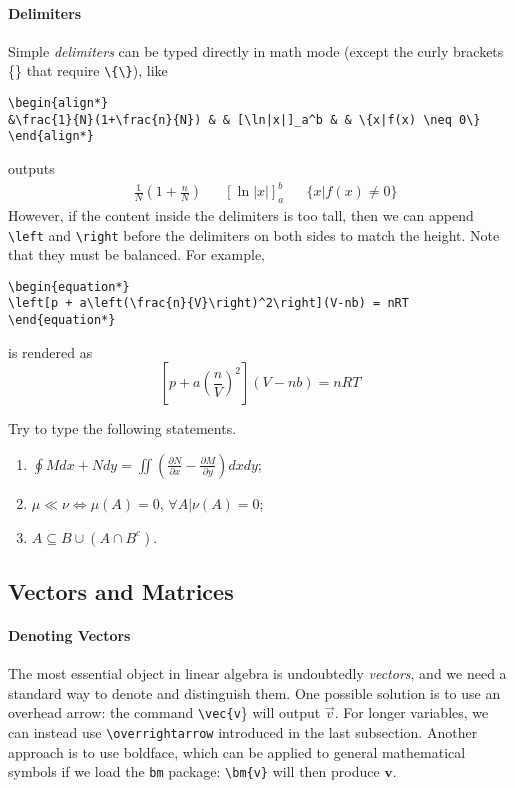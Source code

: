 \paragraph{Delimiters}
Simple \textit{delimiters} can be typed directly in math mode (except the curly brackets \{\} that require \texttt{\textbackslash\{\textbackslash\}}), like
\begin{lstlisting}
\begin{align*}
&\frac{1}{N}(1+\frac{n}{N}) & & [\ln|x|]_a^b & & \{x|f(x) \neq 0\} 
\end{align*}
\end{lstlisting}
outputs
\begin{align*}
&\frac{1}{N}(1+\frac{n}{N}) & & [\ln|x|]_a^b & & \{x|f(x) \neq 0\}  
\end{align*}
However, if the content inside the delimiters is too tall, then we can append \texttt{\textbackslash left} and \texttt{\textbackslash right} before the delimiters on both sides to match the height. Note that they must be balanced. For example,
\begin{lstlisting}
\begin{equation*}
\left[p + a\left(\frac{n}{V}\right)^2\right](V-nb) = nRT
\end{equation*}
\end{lstlisting}
is rendered as
\begin{equation*}
\left[p + a\left(\frac{n}{V}\right)^2\right](V-nb) = nRT
\end{equation*}

\begin{exercisebox}
\begin{Exercise}
Try to type the following statements.
\begin{enumerate}[label=\alph*)]
    \item $\oint M dx + Ndy = \iint (\frac{\partial N}{\partial x} - \frac{\partial M}{\partial y}) dxdy$;
    \item $\mu \ll \nu \Leftrightarrow \mu(A) = 0$, $\forall A|\nu(A) = 0$;
    \item $A \subseteq B \cup (A \cap B^c)$.
\end{enumerate}
\end{Exercise}
\end{exercisebox}

\subsection{Vectors and Matrices}

\paragraph{Denoting Vectors}
The most essential object in linear algebra is undoubtedly \textit{vectors}, and we need a standard way to denote and distinguish them. One possible solution is to use an overhead arrow: the command \texttt{\textbackslash vec\{v}\} will output $\vec{v}$. For longer variables, we can instead use \texttt{\textbackslash overrightarrow} introduced in the last subsection. Another approach is to use boldface, which can be applied to general mathematical symbols if we load the \verb|bm| package: \texttt{\textbackslash bm\{v\}} will then produce $\bm{v}$.

